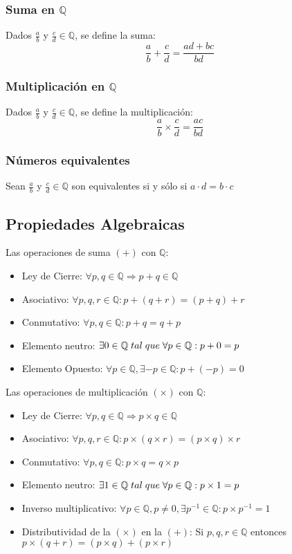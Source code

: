       \subsubsection{Suma en $\mathbb{Q}$}
      Dados $\frac{a}{b}$ y $\frac{c}{d} \in \mathbb{Q}$, se define la suma: \[\frac{a}{b} + \frac{c}{d}= \frac{ad+bc}{bd} \]
      \subsubsection{Multiplicaci\'on en $\mathbb{Q}$}
      Dados $\frac{a}{b}$ y $\frac{c}{d} \in \mathbb{Q}$, se define la multiplicaci\'on: \[ \frac{a}{b} \times \frac{c}{d}= \frac{ac}{bd} \]
      \subsubsection{N\'umeros equivalentes}
      Sean $\frac{a}{b}$ y $\frac{c}{d} \in  \mathbb{Q}$ son equivalentes si y s\'olo si $a\cdot d=b \cdot c$
      \subsection{Propiedades Algebraicas}
      Las operaciones de suma $(+)$ con $\mathbb{Q}$: 
      \begin{itemize}
	 \item Ley de Cierre: $\forall p,q \in \mathbb{Q} \Rightarrow p+q \in \mathbb{Q}$ 
	 \item Asociativo: $\forall p,q,r \in \mathbb{Q}: p+(q+r)=(p+q)+r $
	 \item Conmutativo: $\forall p,q \in \mathbb{Q}: p+q=q+p$
	 \item Elemento neutro: $\exists 0 \in \mathbb{Q} \thickspace tal \thickspace que \thickspace  \forall p \in \mathbb{Q}: p+0=p$
	 \item Elemento Opuesto: $\forall p \in \mathbb{Q}, \exists -p \in \mathbb{Q}: p+(-p)=0$
       \end{itemize}
      Las operaciones de multiplicaci\'on $(\times)$ con $\mathbb{Q}$:
      \begin{itemize}
	 \item Ley de Cierre: $\forall p,q \in \mathbb{Q} \Rightarrow p \times q \in \mathbb{Q}$
	 \item Asociativo: $\forall p,q,r \in \mathbb{Q}: p \times(q \times r)=(p \times q) \times r $
	 \item Conmutativo: $\forall p,q \in \mathbb{Q}: p \times q = q \times p $
	 \item Elemento neutro: $\exists 1 \in \mathbb{Q} \thickspace tal \thickspace que \thickspace \forall p \in \mathbb{Q}: p \times 1= p$
	 \item Inverso multiplicativo: $\forall p \in \mathbb{Q}, p \neq 0, \exists p^{-1} \in \mathbb{Q} : p \times p^{-1} = 1$
	 \item Distributividad de la $(\times)$ en la $(+)$: Si $p,q,r \in \mathbb{Q}$ entonces $p \times (q + r)= (p \times q) + (p \times r)$
      \end{itemize}
